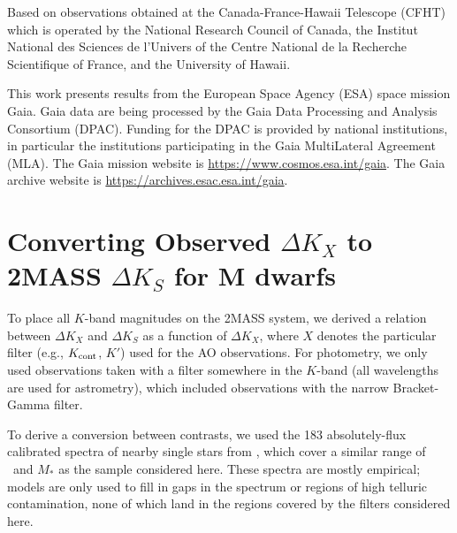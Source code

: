 \documentclass[twocolumn]{aastex62}
\begin{document}
Based on observations obtained at the Canada-France-Hawaii Telescope (CFHT) which is operated by the National Research Council of Canada, the Institut National des Sciences de l'Univers of the Centre National de la Recherche Scientifique of France, and the University of Hawaii. 

This work presents results from the European Space Agency (ESA) space mission Gaia. Gaia data are being processed by the Gaia Data Processing and Analysis Consortium (DPAC). Funding for the DPAC is provided by national institutions, in particular the institutions participating in the Gaia MultiLateral Agreement (MLA). The Gaia mission website is \href{https://www.cosmos.esa.int/gaia}{https://www.cosmos.esa.int/gaia}. The Gaia archive website is \href{https://archives.esac.esa.int/gaia}{https://archives.esac.esa.int/gaia}.





\clearpage




\appendix 
\section{Converting Observed $\Delta K_X$ to 2MASS $\Delta K_S$ for M dwarfs}\label{sec:a1}
To place all $K$-band magnitudes on the 2MASS system, we derived a relation between $\Delta K_X$ and $\Delta K_S$ as a function of $\Delta K_X$, where $X$ denotes the particular filter (e.g., $K_{\rm{cont}}$, $K'$) used for the AO observations. For photometry, we only used observations taken with a filter somewhere in the $K$-band (all wavelengths are used for astrometry), which included observations with the narrow Bracket-Gamma filter. 

To derive a conversion between contrasts, we used the 183 absolutely-flux calibrated spectra of nearby single stars from \citet{Mann2015b}, which cover a similar range of \teff\ and $M_*$ as the sample considered here. These spectra are mostly empirical; models are only used to fill in gaps in the spectrum or regions of high telluric contamination, none of which land in the regions covered by the filters considered here.
\end{document}
